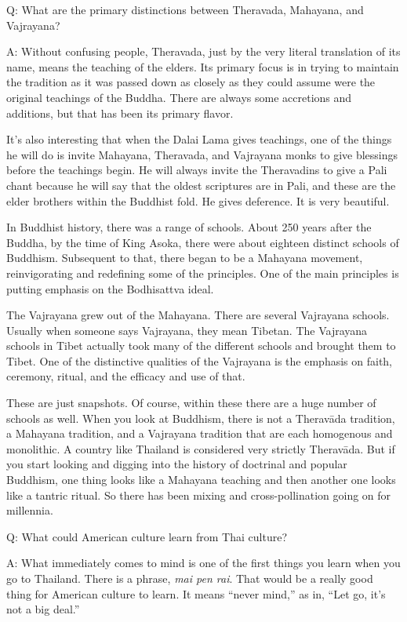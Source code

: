 \qaspace
Q: What are the primary distinctions between Theravada, Mahayana, and
Vajrayana?

\qaspace
A: Without confusing people, Theravada, just by the very literal
translation of its name, means the teaching of the elders. Its primary
focus is in trying to maintain the tradition as it was passed down as
closely as they could assume were the original teachings of the Buddha.
There are always some accretions and additions, but that has been its
primary flavor.

It’s also interesting that when the Dalai Lama gives teachings, one of
the things he will do is invite Mahayana, Theravada, and Vajrayana monks
to give blessings before the teachings begin. He will always invite the
Theravadins to give a Pali chant because he will say that the oldest
scriptures are in Pali, and these are the elder brothers within the
Buddhist fold. He gives deference. It is very beautiful.

In Buddhist history, there was a range of schools. About 250 years after
the Buddha, by the time of King Asoka, there were about eighteen
distinct schools of Buddhism. Subsequent to that, there began to be a
Mahayana movement, reinvigorating and redefining some of the principles.
One of the main principles is putting emphasis on the Bodhisattva ideal.

The Vajrayana grew out of the Mahayana. There are several Vajrayana
schools. Usually when someone says Vajrayana, they mean Tibetan. The
Vajrayana schools in Tibet actually took many of the different schools
and brought them to Tibet. One of the distinctive qualities of the
Vajrayana is the emphasis on faith, ceremony, ritual, and the efficacy
and use of that.

These are just snapshots. Of course, within these there are a huge
number of schools as well. When you look at Buddhism, there is not a
Theravāda tradition, a Mahayana tradition, and a Vajrayana tradition
that are each homogenous and monolithic. A country like Thailand is
considered very strictly Theravāda. But if you start looking and digging
into the history of doctrinal and popular Buddhism, one thing looks like
a Mahayana teaching and then another one looks like a tantric ritual. So
there has been mixing and cross-pollination going on for millennia.

\qaspace
Q: What could American culture learn from Thai culture?

\qaspace
A: What immediately comes to mind is one of the first things you learn
when you go to Thailand. There is a phrase, \emph{mai pen rai}. That
would be a really good thing for American culture to learn. It means
“never mind,” as in, “Let go, it’s not a big deal.”

